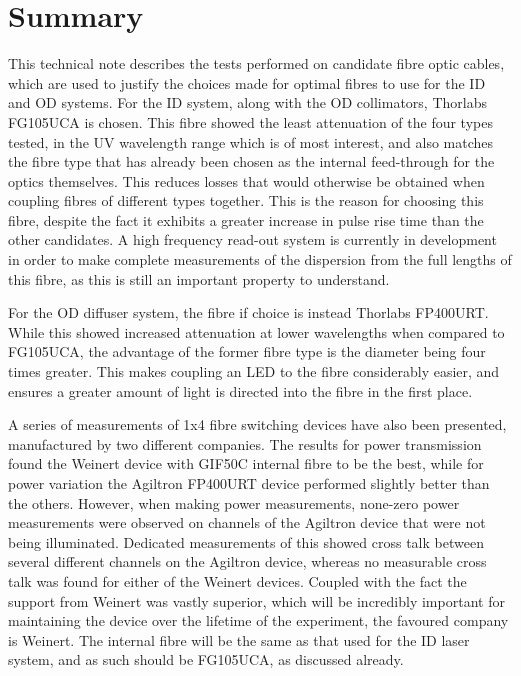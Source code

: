 \documentclass[a4paper,11pt]{article}
\begin{document}
\section{Summary}
This technical note describes the tests performed on candidate fibre optic cables, which are used to justify the choices made for optimal fibres to use for the ID and OD systems. For the ID system, along with the OD collimators, Thorlabs FG105UCA is chosen. This fibre showed the least attenuation of the four types tested, in the UV wavelength range which is of most interest, and also matches the fibre type that has already been chosen as the internal feed-through for the optics themselves. This reduces losses that would otherwise be obtained when coupling fibres of different types together. This is the reason for choosing this fibre, despite the fact it exhibits a greater increase in pulse rise time than the other candidates. A high frequency read-out system is currently in development in order to make complete measurements of the dispersion from the full lengths of this fibre, as this is still an important property to understand.

For the OD diffuser system, the fibre if choice is instead Thorlabs FP400URT. While this showed increased attenuation at lower wavelengths when compared to FG105UCA, the advantage of the former fibre type is the diameter being four times greater. This makes coupling an LED to the fibre considerably easier, and ensures a greater amount of light is directed into the fibre in the first place.

A series of measurements of 1x4 fibre switching devices have also been presented, manufactured by two different companies. The results for power transmission found the Weinert device with GIF50C internal fibre to be the best, while for power variation the Agiltron FP400URT device performed slightly better than the others. However, when making power measurements, none-zero power measurements were observed on channels of the Agiltron device that were not being illuminated. Dedicated measurements of this showed cross talk between several different channels on the Agiltron device, whereas no measurable cross talk was found for either of the Weinert devices. Coupled with the fact the support from Weinert was vastly superior, which will be incredibly important for maintaining the device over the lifetime of the experiment, the favoured company is Weinert. The internal fibre will be the same as that used for the ID laser system, and as such should be FG105UCA, as discussed already.
\end{document}
